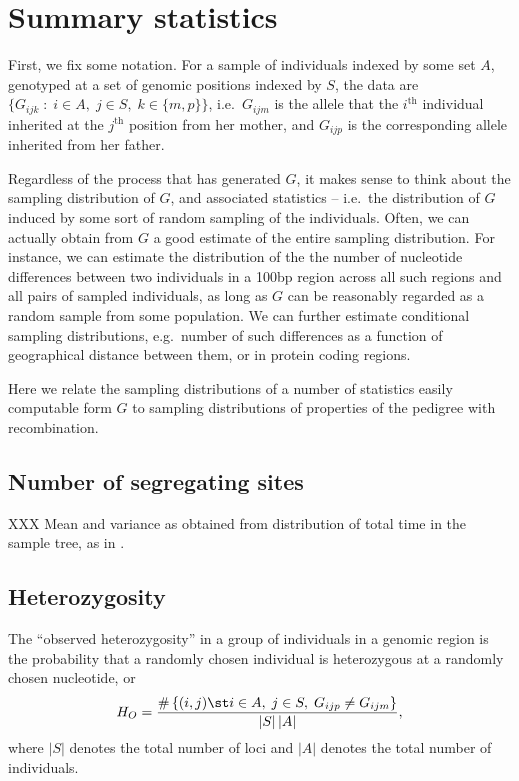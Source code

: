 

\section{Summary statistics}

First, we fix some notation.
For a sample of individuals indexed by some set $A$,
genotyped at a set of genomic positions indexed by $S$,
the data are $\{G_{ijk} \; : \; i \in A, \; j \in S, \; k \in \{m,p\} \}$,
i.e.\ $G_{ijm}$ is the allele that the $i^\mathrm{th}$ individual inherited at the $j^\mathrm{th}$ position from her mother,
and $G_{ijp}$ is the corresponding allele inherited from her father.

Regardless of the process that has generated $G$, 
it makes sense to think about the sampling distribution of $G$,
and associated statistics --
i.e.\ the distribution of $G$ induced by some sort of random sampling of the individuals.
Often, we can actually obtain from $G$ a good estimate of the entire sampling distribution.
For instance, we can estimate the distribution of 
the the number of nucleotide differences between two individuals in a 100bp region
across all such regions and all pairs of sampled individuals,
as long as $G$ can be reasonably regarded as a random sample from some population.
We can further estimate conditional sampling distributions,
e.g.\ number of such differences as a function of geographical distance between them,
or in protein coding regions.

Here we relate the sampling distributions of a number of statistics easily computable form $G$
to sampling distributions of properties of the pedigree with recombination.


\subsection{Number of segregating sites}

XXX Mean and variance as obtained from distribution of total time in the sample tree, as in \citep{hudson1990gene}.



\subsection{Heterozygosity} 

The ``observed heterozygosity'' in a group of individuals in a genomic region 
is the probability that a randomly chosen individual is heterozygous at a randomly chosen nucleotide,
or 
\begin{align}
  H_O = \frac{ \# \left\{ (i,j) \st i \in A, \; j \in S, \; G_{ijp} \neq G_{ijm} \right\} }{ |S|\,|A| } ,
\end{align}
where $|S|$ denotes the total number of loci and $|A|$ denotes the total number of individuals.

